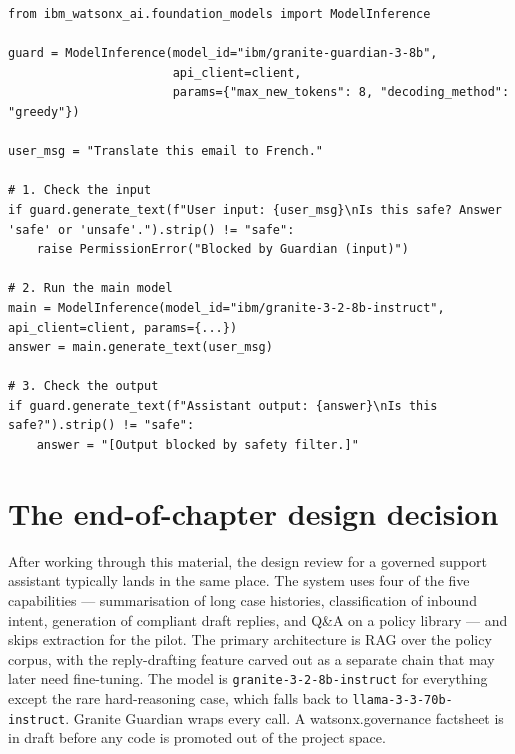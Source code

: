 \begin{examplebox}[title=\textbf{Wrapping an inference call with Guardian}]
\begin{lstlisting}[style=pythonstyle]
from ibm_watsonx_ai.foundation_models import ModelInference

guard = ModelInference(model_id="ibm/granite-guardian-3-8b",
                       api_client=client,
                       params={"max_new_tokens": 8, "decoding_method": "greedy"})

user_msg = "Translate this email to French."

# 1. Check the input
if guard.generate_text(f"User input: {user_msg}\nIs this safe? Answer 'safe' or 'unsafe'.").strip() != "safe":
    raise PermissionError("Blocked by Guardian (input)")

# 2. Run the main model
main = ModelInference(model_id="ibm/granite-3-2-8b-instruct", api_client=client, params={...})
answer = main.generate_text(user_msg)

# 3. Check the output
if guard.generate_text(f"Assistant output: {answer}\nIs this safe?").strip() != "safe":
    answer = "[Output blocked by safety filter.]"
\end{lstlisting}
\end{examplebox}


\section{The end-of-chapter design decision}

After working through this material, the design review for a governed support assistant typically lands in the same place. The system uses four of the five capabilities --- summarisation of long case histories, classification of inbound intent, generation of compliant draft replies, and Q\&A on a policy library --- and skips extraction for the pilot. The primary architecture is RAG over the policy corpus, with the reply-drafting feature carved out as a separate chain that may later need fine-tuning. The model is \texttt{granite-3-2-8b-instruct} for everything except the rare hard-reasoning case, which falls back to \texttt{llama-3-3-70b-instruct}. Granite Guardian wraps every call. A watsonx.governance factsheet is in draft before any code is promoted out of the project space.

